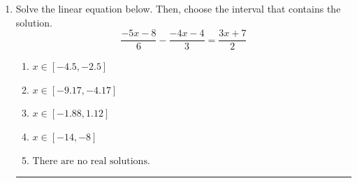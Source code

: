 \documentclass[14pt]{extbook}
\newcommand{\litem}[1]{\item#1\hspace*{-1cm}\rule{\textwidth}{0.4pt}}
\begin{document}
\begin{enumerate}
{\begin{enumerate}[label=\Alph*.]
\end{enumerate} }
\litem{
Solve the linear equation below. Then, choose the interval that contains the solution.\[ \frac{-5x -8}{6} - \frac{-4x -4}{3} = \frac{3x + 7}{2} \]\begin{enumerate}[label=\Alph*.]
\item \( x \in [-4.5, -2.5] \)
\item \( x \in [-9.17, -4.17] \)
\item \( x \in [-1.88, 1.12] \)
\item \( x \in [-14, -8] \)
\item \( \text{There are no real solutions.} \)

\end{enumerate} }
\end{enumerate}
\end{document}
